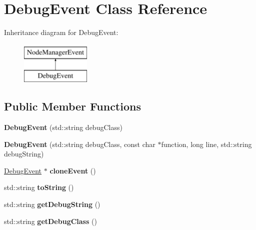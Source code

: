 \hypertarget{class_debug_event}{\section{\-Debug\-Event \-Class \-Reference}
\label{class_debug_event}
}
\-Inheritance diagram for \-Debug\-Event\-:\begin{figure}[H]
\begin{center}
\leavevmode
\includegraphics[height=2.000000cm]{class_debug_event}
\end{center}
\end{figure}
\subsection*{\-Public \-Member \-Functions}
\begin{DoxyCompactItemize}
\item 
\hypertarget{class_debug_event_a910fbc5181909a8a48ad053976de7bfd}{{\bfseries \-Debug\-Event} (std\-::string debug\-Class)}\label{class_debug_event_a910fbc5181909a8a48ad053976de7bfd}

\item 
\hypertarget{class_debug_event_a564b0613afc82d5a0438abb448baa09b}{{\bfseries \-Debug\-Event} (std\-::string debug\-Class, const char $\ast$function, long line, std\-::string debug\-String)}\label{class_debug_event_a564b0613afc82d5a0438abb448baa09b}

\item 
\hypertarget{class_debug_event_aeafb8384544ba6c28979e0b9282394c8}{\hyperlink{class_debug_event}{\-Debug\-Event} $\ast$ {\bfseries clone\-Event} ()}\label{class_debug_event_aeafb8384544ba6c28979e0b9282394c8}

\item 
\hypertarget{class_debug_event_a32f90f157a6c6823ae73596c3992e2b3}{std\-::string {\bfseries to\-String} ()}\label{class_debug_event_a32f90f157a6c6823ae73596c3992e2b3}

\item 
\hypertarget{class_debug_event_a207c670544abfef0f9663be6caf8bd3c}{std\-::string {\bfseries get\-Debug\-String} ()}\label{class_debug_event_a207c670544abfef0f9663be6caf8bd3c}

\item 
\hypertarget{class_debug_event_a3e09f1f86ae306f21df36bad66a10b4f}{std\-::string {\bfseries get\-Debug\-Class} ()}\label{class_debug_event_a3e09f1f86ae306f21df36bad66a10b4f}

\end{DoxyCompactItemize}
